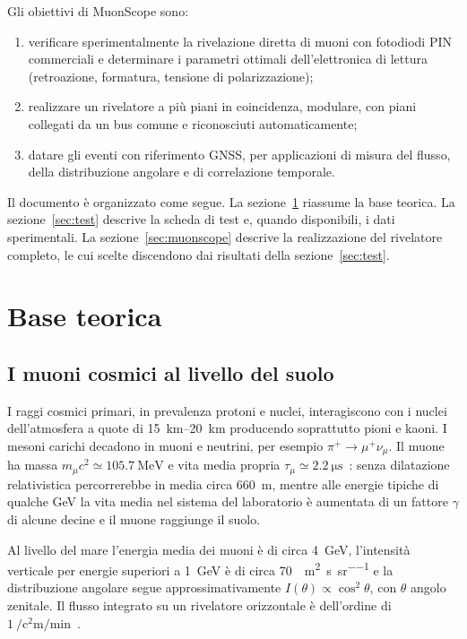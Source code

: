 \documentclass[11pt,a4paper]{article}
\begin{document}
Gli obiettivi di MuonScope sono:
\begin{enumerate}
  \item verificare sperimentalmente la rivelazione diretta di muoni con fotodiodi PIN commerciali e determinare i parametri ottimali dell'elettronica di lettura (retroazione, formatura, tensione di polarizzazione);
  \item realizzare un rivelatore a più piani in coincidenza, modulare, con piani collegati da un bus comune e riconosciuti automaticamente;
  \item datare gli eventi con riferimento GNSS, per applicazioni di misura del flusso, della distribuzione angolare e di correlazione temporale.
\end{enumerate}

Il documento è organizzato come segue. La sezione~\ref{sec:teoria} riassume la base teorica. La sezione~\ref{sec:test} descrive la scheda di test e, quando disponibili, i dati sperimentali. La sezione~\ref{sec:muonscope} descrive la realizzazione del rivelatore completo, le cui scelte discendono dai risultati della sezione~\ref{sec:test}.

\section{Base teorica}\label{sec:teoria}

\subsection{I muoni cosmici al livello del suolo}

I raggi cosmici primari, in prevalenza protoni e nuclei, interagiscono con i nuclei dell'atmosfera a quote di \SIrange{15}{20}{\kilo\metre} producendo soprattutto pioni e kaoni. I mesoni carichi decadono in muoni e neutrini, per esempio $\pi^{+}\to\mu^{+}\nu_{\mu}$. Il muone ha massa $m_\mu c^2 \simeq \SI{105.7}{\mega\electronvolt}$ e vita media propria $\tau_\mu \simeq \SI{2.2}{\micro\second}$~\cite{pdg2024}: senza dilatazione relativistica percorrerebbe in media circa \SI{660}{\metre}, mentre alle energie tipiche di qualche GeV la vita media nel sistema del laboratorio è aumentata di un fattore $\gamma$ di alcune decine e il muone raggiunge il suolo.

Al livello del mare l'energia media dei muoni è di circa \SI{4}{\giga\electronvolt}, l'intensità verticale per energie superiori a \SI{1}{\giga\electronvolt} è di circa \SI{70}{\per\square\metre\per\second\per\steradian} e la distribuzione angolare segue approssimativamente $I(\theta)\propto\cos^2\theta$, con $\theta$ angolo zenitale. Il flusso integrato su un rivelatore orizzontale è dell'ordine di $\SI{1}{\per\square\centi\metre\per\minute}$~\cite{pdg2024,gaisser2016}.
\end{document}
